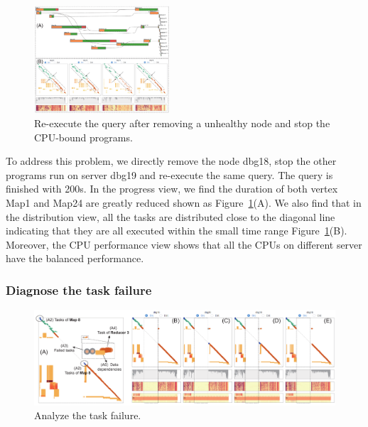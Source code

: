 \begin{figure}[t]
	\centering
	\includegraphics[width=0.45\textwidth]{figures/case_study/CaseStudy1.pdf}
	\vspace{-3mm}
	\caption{Re-execute the query after removing a unhealthy node and stop the CPU-bound programs.}
	\label{fig:casestudy1}
	\vspace{-3mm}
\end{figure}


To address this problem, we directly remove the node dbg18, stop the other programs run on server dbg19 and re-execute the same query. The query is finished with 200s. In the progress view, we find the duration of both vertex Map1 and Map24 are greatly reduced shown as Figure~\ref{fig:casestudy1}(A). We also find that in the distribution view, all the tasks are distributed close to the diagonal line indicating that they are all executed within the small time range Figure~\ref{fig:casestudy1}(B). Moreover, the CPU performance view shows that all the CPUs on different server have the balanced performance. 

\subsubsection{Diagnose the task failure}



\begin{figure}
	\vspace{2mm}
	\centering
	\small
	\includegraphics[width=2\columnwidth]{figures/case_study/CaseStudy2.pdf}  

	\caption{Analyze the task failure.} 
	\label{fig:casestudy2}

\end{figure}


